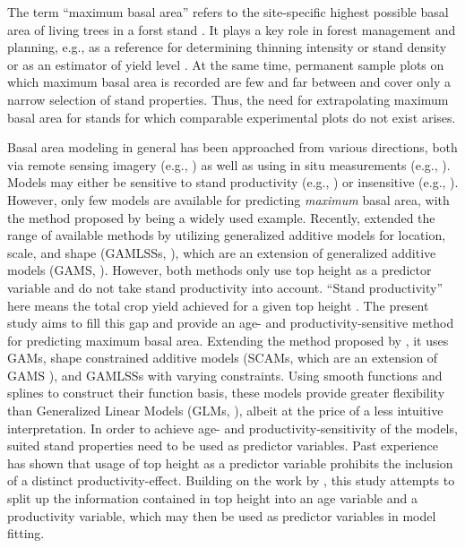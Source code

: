 The term ``maximum basal area'' refers to the site-specific highest possible basal area of living trees in a forst stand \parencite{Assmann1970}.  It plays a key role in forest management and planning, e.g., as a reference for determining thinning intensity \parencite{Assmann1961,Doebbeler2002} or stand density \parencite{Spellmann1999} or as an estimator of yield level \parencite{Franz1967}.  At the same time, permanent sample plots on which maximum basal area is recorded are few and far between and cover only a narrow selection of stand properties.  Thus, the need for extrapolating maximum basal area for stands for which comparable experimental plots do not exist arises.

Basal area modeling in general has been approached from various directions, both via remote sensing imagery (e.g., \textcite{Silva2017}) as well as using in situ measurements (e.g., \textcite{Yue2012}).  Models may either be sensitive to stand productivity (e.g., \textcite{Castedo-Dorado2007}) or insensitive (e.g., \textcite{Monserud1996}).  However, only few models are available for predicting \emph{maximum} basal area, with the method proposed by \textcite{Sterba1975} being a widely used example.  Recently, \textcite{Woerdehoff2014,Woerdehoff2016} extended the range of available methods by utilizing generalized additive models for location, scale, and shape (GAMLSSs, \textcite{Rigby2001}), which are an extension of generalized additive models (GAMS, \textcite{Hastie1991}).  However, both methods only use top height as a predictor variable and do not take stand productivity into account.  ``Stand productivity'' here means the total crop yield achieved for a given top height \parencite{Assmann1970}.  The present study aims to fill this gap and provide an age- and productivity-sensitive method for predicting maximum basal area.  Extending the method proposed by \textcite{Woerdehoff2016}, it uses GAMs, shape constrained additive models (SCAMs, which are an extension of GAMS \parencite{Pya2010}), and GAMLSSs with varying constraints.  Using smooth functions and splines to construct their function basis, these models provide greater flexibility than Generalized Linear Models (GLMs, \textcite{Nelder1972}), albeit at the price of a less intuitive interpretation.  In order to achieve age- and productivity-sensitivity of the models, suited stand properties need to be used as predictor variables.  Past experience has shown that usage of top height as a predictor variable prohibits the inclusion of a distinct productivity-effect.  Building on the work by \textcite{Nagel1999}, this study attempts to split up the information contained in top height into an age variable and a productivity variable, which may then be used as predictor variables in model fitting.

